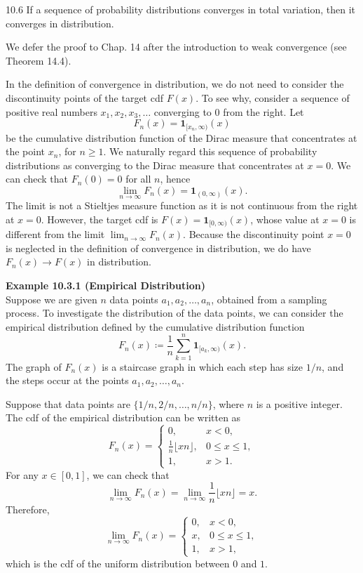 \begin{thmbox}{10.6}
If a sequence of probability distributions converges in total variation, then it converges in distribution.
\end{thmbox}

We defer the proof to Chap. 14 after the introduction to weak convergence (see Theorem 14.4).

In the definition of convergence in distribution, we do not need to consider the discontinuity points of the target cdf $F(x)$. To see why, consider a sequence of positive real numbers $x_1,x_2,x_3,\ldots$ converging to $0$ from the right. Let
\[
F_n(x)=\mathbf{1}_{[x_n,\infty)}(x)
\]
be the cumulative distribution function of the Dirac measure that concentrates at the point $x_n$, for $n\geq 1$. We naturally regard this sequence of probability distributions as converging to the Dirac measure that concentrates at $x=0$. We can check that $F_n(0)=0$ for all $n$, hence
\[
\lim_{n\to\infty}F_n(x)=\mathbf{1}_{(0,\infty)}(x).
\]
The limit is not a Stieltjes measure function as it is not continuous from the right at $x=0$. However, the target cdf is $F(x)=\mathbf{1}_{[0,\infty)}(x)$, whose value at $x=0$ is different from the limit $\lim_{n\to\infty}F_n(x)$. Because the discontinuity point $x=0$ is neglected in the definition of convergence in distribution, we do have $F_n(x)\to F(x)$ in distribution.

\textbf{Example 10.3.1 (Empirical Distribution)} \\
Suppose we are given $n$ data points $a_1,a_2,\ldots,a_n$, obtained from a sampling process. To investigate the distribution of the data points, we can consider the empirical distribution defined by the cumulative distribution function
\[
F_n(x)\coloneqq \frac{1}{n}\sum_{k=1}^{n}\mathbf{1}_{[a_k,\infty)}(x).
\]
The graph of $F_n(x)$ is a staircase graph in which each step has size $1/n$, and the steps occur at the points $a_1,a_2,\ldots,a_n$.

Suppose that data points are $\{1/n,2/n,\ldots,n/n\}$, where $n$ is a positive integer. The cdf of the empirical distribution can be written as
\[
F_n(x)=
\begin{cases}
0, & x<0,\\
\frac{1}{n}\lfloor xn\rfloor, & 0\leq x\leq 1,\\
1, & x>1.
\end{cases}
\]
For any $x\in[0,1]$, we can check that
\[
\lim_{n\to\infty}F_n(x)=\lim_{n\to\infty}\frac{1}{n}\lfloor xn\rfloor=x.
\]
Therefore,
\[
\lim_{n\to\infty}F_n(x)=
\begin{cases}
0, & x<0,\\
x, & 0\leq x\leq 1,\\
1, & x>1,
\end{cases}
\]
which is the cdf of the uniform distribution between $0$ and $1$.

